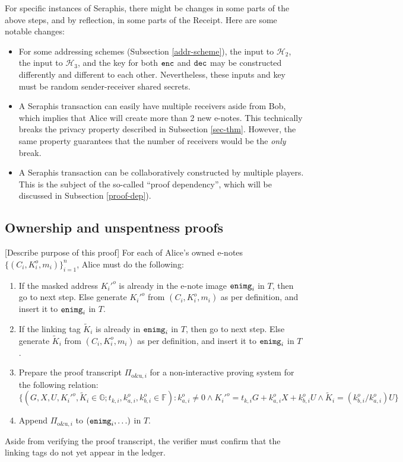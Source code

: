 \documentclass{article}
\theoremstyle{plain}
\theoremstyle{remark}
\begin{document}
For specific instances of Seraphis, there might be changes in some parts of the above steps, and by reflection, in some parts of the Receipt. Here are some notable changes:
\begin{itemize}
\item For some addressing schemes (Subsection \ref{addr-scheme}), the input to $\mathcal{H}_2$, the input to $\mathcal{H}_3$, and the key for both ${\tt enc}$ and ${\tt dec}$ may be constructed differently and different to each other. Nevertheless, these inputs and key must be random sender-receiver shared secrets.
\item A Seraphis transaction can easily have multiple receivers aside from Bob, which implies that Alice will create more than 2 new e-notes. This technically breaks the privacy property described in Subsection \ref{sec-thm}. However, the same property guarantees that the number of receivers would be the \textit{only} break. %
\item A Seraphis transaction can be collaboratively constructed by multiple players. This is the subject of the so-called ``proof dependency'', which will be discussed in Subsection \ref{proof-dep}). %
\end{itemize}

\subsection{Ownership and unspentness proofs}\label{own-unsp}
[Describe purpose of this proof] For each of Alice's owned e-notes $\{(C_i,K_i^o,m_i)\}_{i=1}^n$, Alice must do the following:
\begin{enumerate}
    \item If the masked address $K_i'^o$ is already in the e-note image ${\tt enimg}_i$ in $T$, then go to next step. Else generate $K_i'^o$ from $(C_i, K_i^o, m_i)$ as per definition, and insert it to ${\tt enimg}_i$ in $T$.
    \item If the linking tag $\tilde{K}_i$ is already in ${\tt enimg}_i$ in $T$, then go to next step. Else generate $\tilde{K}_i$ from $(C_i, K_i^o, m_i)$ as per definition, and insert it to ${\tt enimg}_i$ in $T$.
    \item Prepare the proof transcript $\Pi_{\text{o\&u}, i}$ for a non-interactive proving system for the following relation:
$$\{(G, X, U, K_i'^o, \tilde{K}_i\in\mathbb{G}; t_{k,i}, k_{a,i}^o, k_{b,i}^o\in\mathbb{F}): k_{a,i}^o \ne 0 \wedge K_i'^o = t_{k,i} G + k_{a,i}^o X + k_{b,i}^o U \wedge \tilde{K}_i = (k_{b,i}^o/k_{a,i}^o)U \}$$
    \item Append $\Pi_{\text{o\&u}, i}$ to $({\tt enimg}_i, \ldots)$ in $T$.
\end{enumerate}
Aside from verifying the proof transcript, the verifier must confirm that the linking tags do not yet appear in the ledger.
\end{document}
